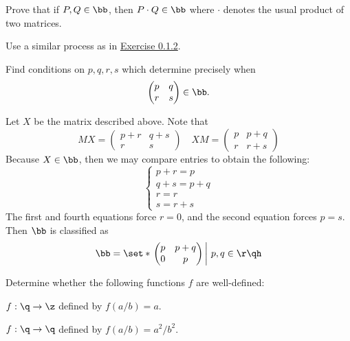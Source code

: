 \begin{exercise}\label{ex0.1.3}
    Prove that if $P, Q \in \bb$, then $P\cdot Q \in \bb$ where $\cdot$ denotes the usual product of two matrices.
\end{exercise}

\begin{sol}
    Use a similar process as in \hyperref[ex0.1.2]{Exercise 0.1.2}.
\end{sol}

\begin{exercise}\label{ex0.1.4}
    Find conditions on $p, q, r, s$ which determine precisely when
    \[
    \begin{pmatrix}
        p & q \\
        r & s
    \end{pmatrix} \in \bb.
    \]
\end{exercise}

\begin{sol}
    Let $X$ be the matrix described above. Note that
    \[
    MX =
    \begin{pmatrix}
        p + r & q + s \\
        r & s
    \end{pmatrix} \quad
    XM = 
    \begin{pmatrix}
        p & p + q \\
        r & r + s
    \end{pmatrix}
    \]
    Because $X \in \bb$, then we may compare entries to obtain the following:
    \[
    \begin{cases}
        p + r = p \\
        q + s = p + q \\
        r = r \\
        s = r + s
    \end{cases}
    \]
    The first and fourth equations force $r = 0$, and the second equation forces $p = s$. Then $\bb$ is classified as
    \[\bb = \set*{\left.
    \begin{pmatrix}
        p & p + q \\
        0 & p
    \end{pmatrix}\,\right|\, p, q \in \r} \qh\]
\end{sol}

\begin{exercise}\label{ex0.1.5}
    Determine whether the following functions $f$ are well-defined:
    \begin{subproblems}
        \item $f : \q \to \z$ defined by $f(a/b) = a$.
        \item $f : \q \to \q$ defined by $f(a/b) = a^2/b^2$.
    \end{subproblems}
\end{exercise}

